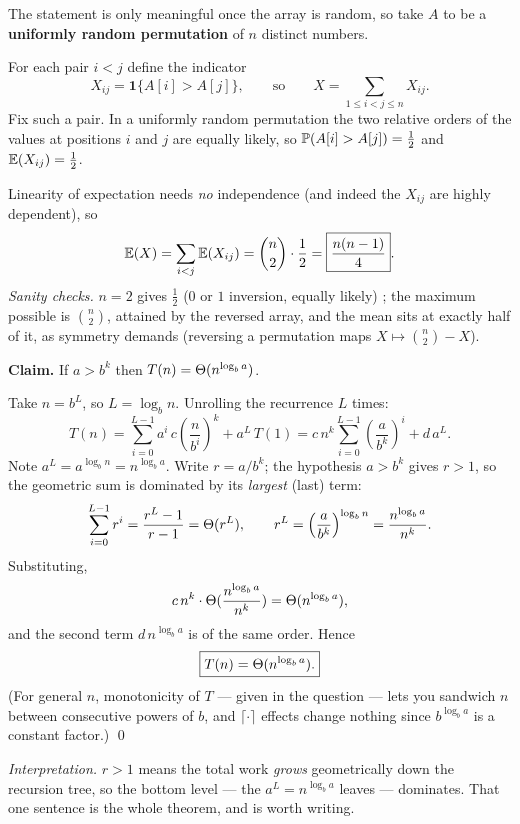  The statement is only meaningful once the array is random, so take $A$ to be a
\textbf{uniformly random permutation} of $n$ distinct numbers.

For each pair $i<j$ define the indicator
\[
  X_{ij}=\mathbf 1\{A[i]>A[j]\},\qquad\text{so}\qquad X=\sum_{1\le i<j\le n}X_{ij}.
\]
Fix such a pair. In a uniformly random permutation the two relative orders of the values at
positions $i$ and $j$ are equally likely, so $\mathbb{P}(A[i]>A[j])=\tfrac12$ and
$\mathbb{E}(X_{ij})=\tfrac12$.

Linearity of expectation needs \emph{no} independence (and indeed the $X_{ij}$ are highly
dependent), so
\[
  \mathbb{E}(X)=\sum_{i<j}\mathbb{E}(X_{ij})=\binom n2\cdot\frac12=\boxed{\frac{n(n-1)}{4}} .
\]
\emph{Sanity checks.} $n=2$ gives $\tfrac12$ ($0$ or $1$ inversion, equally likely) \checkmark;
the maximum possible is $\binom n2$, attained by the reversed array, and the mean sits at exactly
half of it, as symmetry demands (reversing a permutation maps $X\mapsto\binom n2-X$).

 \textbf{Claim.} If $a>b^k$ then $T(n)=\Theta(n^{\log_b a})$.

Take $n=b^L$, so $L=\log_b n$. Unrolling the recurrence $L$ times:
\[
  T(n)=\sum_{i=0}^{L-1}a^i\,c\!\left(\frac{n}{b^i}\right)^{\!k}+a^L\,T(1)
      =c\,n^k\sum_{i=0}^{L-1}\left(\frac{a}{b^k}\right)^{\!i}+d\,a^L .
\]
Note $a^L=a^{\log_b n}=n^{\log_b a}$. Write $r=a/b^k$; the hypothesis $a>b^k$ gives $r>1$, so the
geometric sum is dominated by its \emph{largest} (last) term:
\[
  \sum_{i=0}^{L-1}r^i=\frac{r^L-1}{r-1}=\Theta(r^L),
  \qquad
  r^L=\left(\frac{a}{b^k}\right)^{\log_b n}=\frac{n^{\log_b a}}{n^{k}} .
\]
Substituting,
\[
  c\,n^k\cdot\Theta(\frac{n^{\log_b a}}{n^k})=\Theta(n^{\log_b a}),
\]
and the second term $d\,n^{\log_b a}$ is of the same order. Hence
\[
  \boxed{T(n)=\Theta(n^{\log_b a}) .}
\]
(For general $n$, monotonicity of $T$ --- given in the question --- lets you sandwich $n$ between
consecutive powers of $b$, and $\lceil\cdot\rceil$ effects change nothing since
$b^{\log_b a}$ is a constant factor.) \qed

\emph{Interpretation.} $r>1$ means the total work \emph{grows} geometrically down the recursion
tree, so the bottom level --- the $a^L=n^{\log_b a}$ leaves --- dominates. That one sentence is
the whole theorem, and is worth writing.

